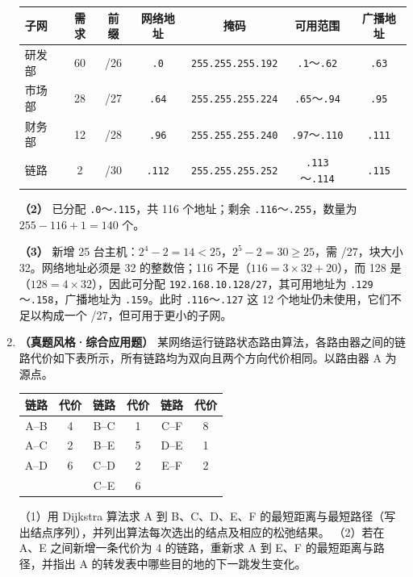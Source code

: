 \begin{enumerate}[start=7]
\begin{center}
\begin{tabular}{lcccccc}
\toprule
子网 & 需求 & 前缀 & 网络地址 & 掩码 & 可用范围 & 广播地址 \\
\midrule
研发部 & 60 & /26 & \texttt{.0} & \texttt{255.255.255.192} & \texttt{.1}～\texttt{.62} & \texttt{.63} \\
市场部 & 28 & /27 & \texttt{.64} & \texttt{255.255.255.224} & \texttt{.65}～\texttt{.94} & \texttt{.95} \\
财务部 & 12 & /28 & \texttt{.96} & \texttt{255.255.255.240} & \texttt{.97}～\texttt{.110} & \texttt{.111} \\
链路 & 2 & /30 & \texttt{.112} & \texttt{255.255.255.252} & \texttt{.113}～\texttt{.114} & \texttt{.115} \\
\bottomrule
\end{tabular}
\end{center}

\textbf{（2）} 已分配 \texttt{.0}～\texttt{.115}，共 116 个地址；剩余 \texttt{.116}～\texttt{.255}，数量为 $255-116+1=140$ 个。

\textbf{（3）} 新增 25 台主机：$2^4-2=14<25$，$2^5-2=30\ge25$，需 /27，块大小 32。网络地址必须是 32 的整数倍；116 不是（$116=3\times32+20$），而 128 是（$128=4\times32$），因此可分配 \texttt{192.168.10.128/27}，其可用地址为 \texttt{.129}～\texttt{.158}，广播地址为 \texttt{.159}。此时 \texttt{.116}～\texttt{.127} 这 12 个地址仍未使用，它们不足以构成一个 /27，但可用于更小的子网。\else \answerarea[10] \fi

\item \textbf{（真题风格·综合应用题）} 某网络运行链路状态路由算法，各路由器之间的链路代价如下表所示，所有链路均为双向且两个方向代价相同。以路由器 A 为源点。
\begin{center}
\begin{tabular}{cc|cc|cc}
\toprule
链路 & 代价 & 链路 & 代价 & 链路 & 代价 \\
\midrule
A--B & 4 & B--C & 1 & C--F & 8 \\
A--C & 2 & B--E & 5 & D--E & 1 \\
A--D & 6 & C--D & 2 & E--F & 2 \\
 & & C--E & 6 & & \\
\bottomrule
\end{tabular}
\end{center}
（1）用 Dijkstra 算法求 A 到 B、C、D、E、F 的最短距离与最短路径（写出结点序列），并列出算法每次选出的结点及相应的松弛结果。
（2）若在 A、E 之间新增一条代价为 4 的链路，重新求 A 到 E、F 的最短距离与路径，并指出 A 的转发表中哪些目的地的下一跳发生变化。


\end{enumerate}
